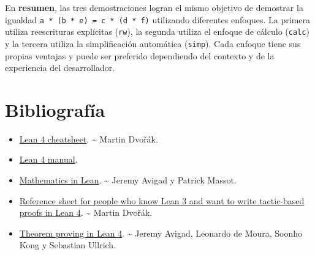 En \textbf{resumen}, las tres demostraciones logran el mismo objetivo de
demostrar la igualdad \texttt{a * (b * e) = c * (d * f)} utilizando diferentes
enfoques. La primera utiliza reescrituras explícitas (\texttt{rw}), la segunda
utiliza el enfoque de cálculo (\texttt{calc}) y la tercera utiliza la
simplificación automática (\texttt{simp}). Cada enfoque tiene sus propias
ventajas y puede ser preferido dependiendo del contexto y de la
experiencia del desarrollador.

\chapter{Bibliografía}
\label{sec:org2227bb6}

\begin{itemize}
\item \href{https://raw.githubusercontent.com/madvorak/lean4-cheatsheet/main/lean-tactics.pdf}{Lean 4 cheatsheet}. \textasciitilde{} Martin Dvořák.
\item \href{https://leanprover.github.io/lean4/doc/whatIsLean.html}{Lean 4 manual}.
\item \href{https://leanprover-community.github.io/mathematics\_in\_lean/mathematics\_in\_lean.pdf}{Mathematics in Lean}. \textasciitilde{} Jeremy Avigad y Patrick Massot.
\item \href{https://github.com/madvorak/lean3-tactic-lean4/blob/main/README.md}{Reference sheet for people who know Lean 3 and want to write tactic-based proofs in Lean 4}. \textasciitilde{} Martin Dvořák.
\item \href{https://leanprover.github.io/theorem\_proving\_in\_lean4/title\_page.html}{Theorem proving in Lean 4}. \textasciitilde{} Jeremy Avigad, Leonardo de Moura, Soonho
Kong y Sebastian Ullrich.
\end{itemize}


